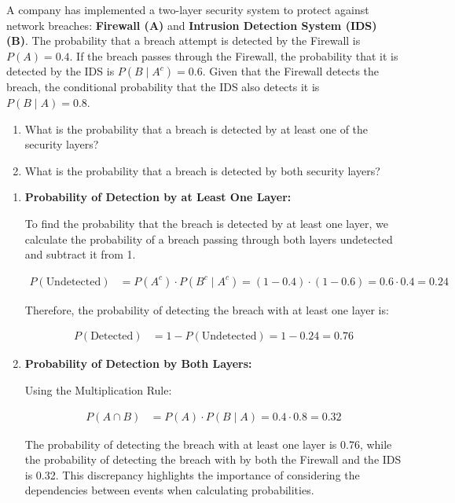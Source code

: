 \begin{example}
A company has implemented a two-layer security system to protect against network breaches: \textbf{Firewall (A)} and \textbf{Intrusion Detection System (IDS) (B)}. The probability that a breach attempt is detected by the Firewall is \( P(A) = 0.4 \). If the breach passes through the Firewall, the probability that it is detected by the IDS is \( P(B \mid A^c) = 0.6 \). Given that the Firewall detects the breach, the conditional probability that the IDS also detects it is \( P(B \mid A) = 0.8 \).

\begin{enumerate}[label=(\alph*)]
    \item What is the probability that a breach is detected by at least one of the security layers?
    \item What is the probability that a breach is detected by both security layers?
\end{enumerate}

\end{example}

\begin{solution}
\begin{enumerate}[label=(\alph*)]
    \item \textbf{Probability of Detection by at Least One Layer:}

    To find the probability that the breach is detected by at least one layer, we calculate the probability of a breach passing through both layers undetected and subtract it from 1.

    \begin{align*}
        P(\text{Undetected}) &= P(A^c) \cdot P(B^c \mid A^c)
        = (1 - 0.4) \cdot (1 - 0.6)
        = 0.6 \cdot 0.4
        = 0.24
    \end{align*}

    Therefore, the probability of detecting the breach with at least one layer is:

    \begin{align*}
    P(\text{Detected}) &= 1 - P(\text{Undetected}) = 1 - 0.24 = 0.76
    \end{align*}

    \item \textbf{Probability of Detection by Both Layers:}

    Using the Multiplication Rule:

    \begin{align*}
    P(A \cap B) &= P(A) \cdot P(B \mid A) = 0.4 \cdot 0.8 = 0.32
    \end{align*}

    The probability of detecting the breach with at least one layer is 0.76, while the probability of detecting the breach with by both the Firewall and the IDS is 0.32. This discrepancy highlights the importance of considering the dependencies between events when calculating probabilities.
\end{enumerate}
\leavevmode\end{solution}

